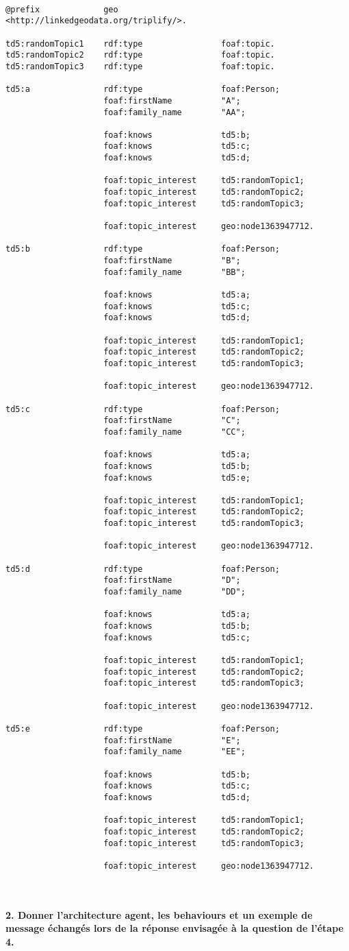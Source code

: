 \documentclass[11pt]{report}
\begin{document}
~\\
\begin{lstlisting}
@prefix				geo						<http://linkedgeodata.org/triplify/>.

td5:randomTopic1 	rdf:type 				foaf:topic.	
td5:randomTopic2	rdf:type 				foaf:topic.	
td5:randomTopic3	rdf:type 				foaf:topic.	

td5:a				rdf:type				foaf:Person;
					foaf:firstName			"A";
					foaf:family_name		"AA";

					foaf:knows				td5:b;
					foaf:knows				td5:c;
					foaf:knows				td5:d;

					foaf:topic_interest		td5:randomTopic1;
					foaf:topic_interest		td5:randomTopic2;
					foaf:topic_interest		td5:randomTopic3;
					
					foaf:topic_interest		geo:node1363947712.

td5:b				rdf:type				foaf:Person;
					foaf:firstName			"B";
					foaf:family_name		"BB";

					foaf:knows				td5:a;
					foaf:knows				td5:c;
					foaf:knows				td5:d;

					foaf:topic_interest		td5:randomTopic1;
					foaf:topic_interest		td5:randomTopic2;
					foaf:topic_interest		td5:randomTopic3;
					
					foaf:topic_interest		geo:node1363947712.
				
td5:c				rdf:type				foaf:Person;
					foaf:firstName			"C";
					foaf:family_name		"CC";

					foaf:knows				td5:a;
					foaf:knows				td5:b;
					foaf:knows				td5:e;

					foaf:topic_interest		td5:randomTopic1;
					foaf:topic_interest		td5:randomTopic2;
					foaf:topic_interest		td5:randomTopic3;
					
					foaf:topic_interest		geo:node1363947712.
					
td5:d				rdf:type				foaf:Person;
					foaf:firstName			"D";
					foaf:family_name		"DD";

					foaf:knows				td5:a;
					foaf:knows				td5:b;
					foaf:knows				td5:c;

					foaf:topic_interest		td5:randomTopic1;
					foaf:topic_interest		td5:randomTopic2;
					foaf:topic_interest		td5:randomTopic3;
					
					foaf:topic_interest		geo:node1363947712.
					
td5:e				rdf:type				foaf:Person;
					foaf:firstName			"E";
					foaf:family_name		"EE";

					foaf:knows				td5:b;
					foaf:knows				td5:c;
					foaf:knows				td5:d;

					foaf:topic_interest		td5:randomTopic1;
					foaf:topic_interest		td5:randomTopic2;
					foaf:topic_interest		td5:randomTopic3;
					
					foaf:topic_interest		geo:node1363947712.
\end{lstlisting}

~\\\\
\textbf{2. Donner l'architecture agent, les behaviours et un exemple de message échangés lors de la réponse envisagée à la question de l'étape 4.}
\end{document}
